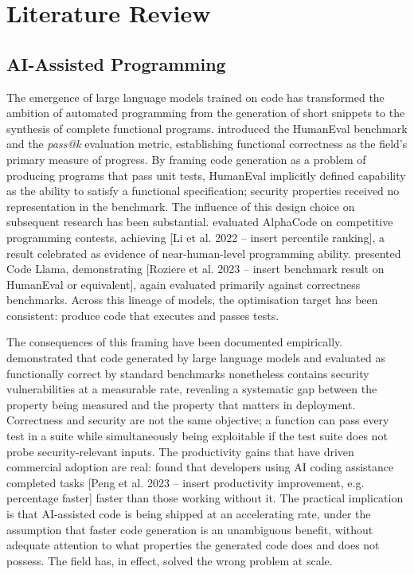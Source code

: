 
\section{Literature Review}

\subsection{AI-Assisted Programming}

The emergence of large language models trained on code has transformed the ambition of automated programming from the generation of short snippets to the synthesis of complete functional programs. \citet{chen2021} introduced the HumanEval benchmark and the \textit{pass@k} evaluation metric, establishing functional correctness as the field's primary measure of progress. By framing code generation as a problem of producing programs that pass unit tests, HumanEval implicitly defined capability as the ability to satisfy a functional specification; security properties received no representation in the benchmark. The influence of this design choice on subsequent research has been substantial. \citet{li2022alphacode} evaluated AlphaCode on competitive programming contests, achieving [Li et al. 2022 -- insert percentile ranking], a result celebrated as evidence of near-human-level programming ability. \citet{roziere2023} presented Code Llama, demonstrating [Roziere et al. 2023 -- insert benchmark result on HumanEval or equivalent], again evaluated primarily against correctness benchmarks. Across this lineage of models, the optimisation target has been consistent: produce code that executes and passes tests.

The consequences of this framing have been documented empirically. \citet{liu2023} demonstrated that code generated by large language models and evaluated as functionally correct by standard benchmarks nonetheless contains security vulnerabilities at a measurable rate, revealing a systematic gap between the property being measured and the property that matters in deployment. Correctness and security are not the same objective; a function can pass every test in a suite while simultaneously being exploitable if the test suite does not probe security-relevant inputs. The productivity gains that have driven commercial adoption are real: \citet{peng2023} found that developers using AI coding assistance completed tasks [Peng et al. 2023 -- insert productivity improvement, e.g. percentage faster] faster than those working without it. The practical implication is that AI-assisted code is being shipped at an accelerating rate, under the assumption that faster code generation is an unambiguous benefit, without adequate attention to what properties the generated code does and does not possess. The field has, in effect, solved the wrong problem at scale.

